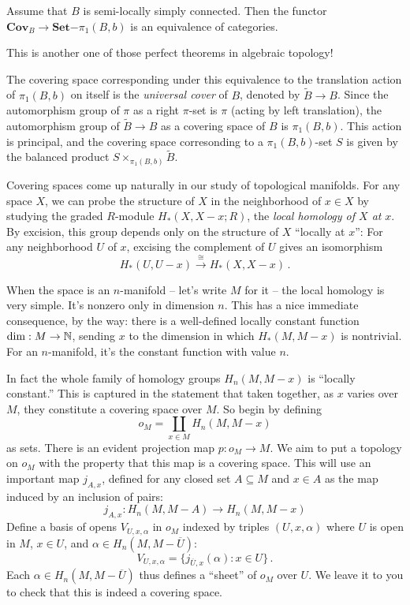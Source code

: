 \begin{theorem} Assume that $B$ is semi-locally simply connected.
Then the functor 
$\mathbf{Cov}_B\to\mathbf{Set}\mathrm{-}\pi_1(B,b)$ is an equivalence of 
categories. 
\end{theorem}

This is another one of those perfect theorems in algebraic topology! 

The covering space corresponding under this equivalence to the translation
action of $\pi_1(B,b)$ on itself is the {\em universal cover} of $B$,
denoted by $\widetilde B\to B$. Since the automorphism group of $\pi$ as
a right $\pi$-set is $\pi$ (acting by left translation), the automorphism
group of $\widetilde B\to B$ as a covering space of $B$ is $\pi_1(B,b)$. 
This action is principal, and the covering space corresonding to 
a $\pi_1(B,b)$-set $S$ is given by the balanced product 
$S\times_{\pi_1(B,b)}\widetilde B$. 

\medskip
Covering spaces come up naturally in our study of topological manifolds. 
For any space $X$, we can probe the structure of $X$ in the neighborhood
of $x\in X$ by studying the graded $R$-module $H_*(X,X-x;R)$, the
{\em local homology of $X$ at} $x$. By excision, this group depends only
on the structure of $X$ ``locally at $x$'': For any neighborhood $U$ of $x$,
excising the complement of $U$ gives an isomorphism
\[
H_*(U,U-x)\xrightarrow{\cong} H_*(X,X-x)\,.
\]

When the space is an $n$-manifold -- let's write $M$ for it -- the local
homology is very simple. It's nonzero only in dimension $n$. This has a
nice immediate consequence, by the way: there is a well-defined 
locally constant function
$\dim:M\to\mathbb N$, sending $x$ to the dimension in which $H_*(M,M-x)$ is 
nontrivial. For an $n$-manifold, it's the constant function with value $n$.

In fact the whole family of homology groups $H_n(M,M-x)$ 
is ``locally constant.'' 
This is captured in the statement that taken together, as $x$ varies over
$M$, they constitute a covering space over $M$. So begin by defining
\[
o_M=\coprod_{x\in M}H_n(M,M-x)
\]
as sets.
There is an evident projection map $p:o_M\to M$. We aim to put a topology on
$o_M$ with the property that this map is a covering space. This will use
an important map $j_{A,x}$, defined for any closed set $A\subseteq M$ 
and $x\in A$ as the map induced by an inclusion of pairs: 
\[
j_{A,x}:H_n(M,M-A)\to H_n(M,M-x)
\]
Define a basis of opens $V_{U,x,\alpha}$ in $o_M$ 
indexed by triples $(U,x,\alpha)$ where $U$ is 
open in $M$, $x\in U$, and $\alpha\in H_n(M,M-\overline U)$:
\[
V_{U,x,\alpha}=\{j_{\overline{U},x}(\alpha):x\in U\}\,.
\]
Each $\alpha\in H_n(M,M-\overline U)$ thus defines a ``sheet'' of $o_M$
over $U$. We leave it to you to check that this is indeed a covering space. 

